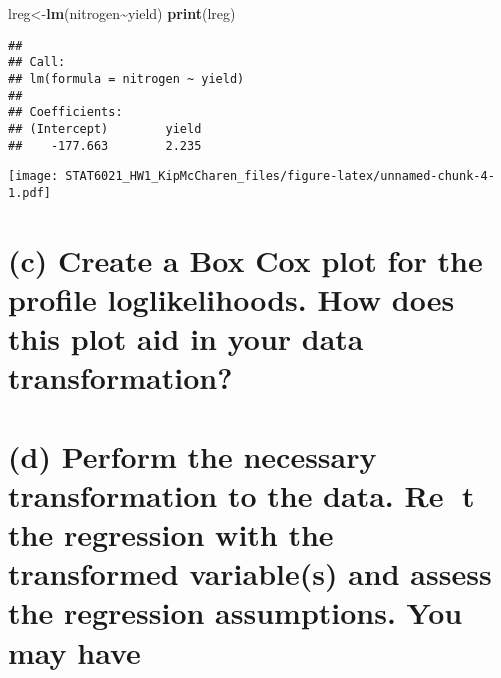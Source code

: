 \documentclass[
]{article}
\newenvironment{Shaded}{\begin{snugshade}}{\end{snugshade}}
\newcommand{\DataTypeTok}[1]{\textcolor[rgb]{0.13,0.29,0.53}{#1}}
\newcommand{\KeywordTok}[1]{\textcolor[rgb]{0.13,0.29,0.53}{\textbf{#1}}}
\newcommand{\NormalTok}[1]{#1}
\newcommand{\OperatorTok}[1]{\textcolor[rgb]{0.81,0.36,0.00}{\textbf{#1}}}
\newcommand{\StringTok}[1]{\textcolor[rgb]{0.31,0.60,0.02}{#1}}
\begin{document}
\begin{Shaded}
\begin{Highlighting}[]
\NormalTok{lreg\textless{}{-}}\KeywordTok{lm}\NormalTok{(nitrogen}\OperatorTok{\textasciitilde{}}\NormalTok{yield)}
\KeywordTok{print}\NormalTok{(lreg)}
\end{Highlighting}
\end{Shaded}

\begin{verbatim}
## 
## Call:
## lm(formula = nitrogen ~ yield)
## 
## Coefficients:
## (Intercept)        yield  
##    -177.663        2.235
\end{verbatim}

\begin{Shaded}
\end{Shaded}

\texttt{[image: STAT6021\_HW1\_KipMcCharen\_files/figure-latex/unnamed-chunk-4-1.pdf]}

\hypertarget{c-create-a-box-cox-plot-for-the-profile-loglikelihoods.-how-does-this-plot-aid-in-your-data-transformation}{%
\section{(c) Create a Box Cox plot for the profile loglikelihoods. How
does this plot aid in your data
transformation?}\label{c-create-a-box-cox-plot-for-the-profile-loglikelihoods.-how-does-this-plot-aid-in-your-data-transformation}}

\hypertarget{section}{%
\section{}\label{section}}

\hypertarget{d-perform-the-necessary-transformation-to-the-data.-re-t-the-regression-with-the-transformed-variables-and-assess-the-regression-assumptions.-you-may-have}{%
\section{(d) Perform the necessary transformation to the data. Re t the
regression with the transformed variable(s) and assess the regression
assumptions. You may
have}\label{d-perform-the-necessary-transformation-to-the-data.-re-t-the-regression-with-the-transformed-variables-and-assess-the-regression-assumptions.-you-may-have}}
\end{document}
